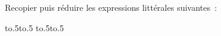 \documentclass[exercice]{thedocument}%
\begin{document}
%
    Recopier puis réduire les expressions littérales suivantes~:\par\vskip10pt\noindent
    \hbox{\hbox to.5\hbox to.5}\vskip10pt\noindent
    \hbox{\hbox to.5\hbox to.5}
\end{document}

